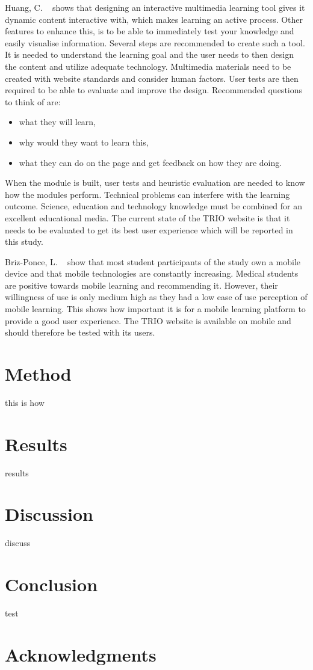 \documentclass{sigchi}
\begin{document}
Huang, C. ~\cite{Huang2005} shows that designing an interactive multimedia learning tool gives it dynamic content interactive with, which makes learning an active process. Other features to enhance this, is to be able to immediately test your knowledge and easily visualise information. Several steps are recommended to create such a tool. It is needed to understand the learning goal and the user needs to then design the content and utilize adequate technology. Multimedia materials need to be created with website standards and consider human factors. User tests are then required to be able to evaluate and improve the design. Recommended questions to think of are:

\begin{itemize}
    \item what they will learn, 
    \item why would they want to learn this, 
    \item what they can do on the page and get feedback on how they are doing. 
\end{itemize}

When the module is built, user tests and heuristic evaluation are needed to know how the modules perform. Technical problems can interfere with the learning outcome. Science, education and technology knowledge must be combined for an excellent educational media. The current state of the TRIO website is that it needs to be evaluated to get its best user experience which will be reported in this study. 

Briz-Ponce, L. ~\cite{Briz-Ponce2017} show that most student participants of the study own a mobile device and that mobile technologies are constantly increasing. Medical students are positive towards mobile learning and recommending it. However, their willingness of use is only medium high as they had a low ease of use perception of mobile learning. This shows how important it is for a mobile learning platform to provide a good user experience. The TRIO website is available on mobile and should therefore be tested with its users. 



\section{Method}
this is how 

\section{Results}
results

\section{Discussion}
discuss

\section{Conclusion}
test~\cite{Laidsaar-Powell2017}

\section{Acknowledgments}

\balance{}



\end{document}
